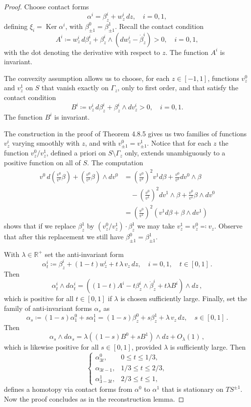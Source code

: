 \documentclass[a4paper, 11pt]{amsart}
\theoremstyle{plain}
\theoremstyle{definition}
\newcommand{\R}{\mathbb{R}}
\DeclareMathOperator{\Ker}{Ker}
\begin{document}
\begin{proof}
	Choose contact forms 
	\[
		\alpha^i = \beta^i_z + w^i_z\, dz, \quad i=0, 1,
	\]
	defining $\xi_i = \Ker \alpha^i$, with $\beta^0_{\pm 1} = \beta^1_{\pm 1}$. Recall the contact condition 
	\[
		A^i \coloneqq w^i_z\, d\beta^i_z + \beta^i_z \wedge (dw^i_z - \dot{\beta}^i_z) > 0, \quad i=0, 1,
	\]
	with the dot denoting the derivative with respect to $z$. The function $A^i$ is invariant.
	
	The convexity assumption allows us to choose, for each $z \in [-1, 1]$, functions $v^0_z$ and $v^1_z$ on $S$ that vanish exactly on $\Gamma_z$, only to first order, and that satisfy the contact condition
	\[
		B^i \coloneqq  v^i_z\, d\beta^i_z + \beta^i_z \wedge dv^i_z > 0, \quad i=0, 1.
	\]
	The function $B^i$ is invariant.
	
	The construction in the proof of Theorem 4.8.5 gives us two families of functions $v^i_z$ varying smoothly with $z$, and with $v^0_{\pm 1} = v^1_{\pm 1}$. Notice that for each $z$ the function $v^0_z/v^1_z$, defined a priori on $S \setminus \Gamma_z$ only, extends unambiguously to a positive function on all of $S$. The computation
	\[
	\begin{split} 
		v^0\, d\left(\frac{v^0}{v^1}\beta\right) + \left(\frac{v^0}{v^1}\beta\right) \wedge dv^0 &= \left(\frac{v^0}{v^1}\right)^2 v^1d\beta + \frac{v^0}{v^1} dv^0 \wedge \beta \\ 
		& \quad - \left(\frac{v^0}{v^1}\right)^2 dv^1 \wedge \beta + \frac{v^0}{v^1}\beta \wedge dv^0 \\ 
		&= \left(\frac{v^0}{v^1}\right)^2 (v^1 d\beta + \beta \wedge dv^1) 
	\end{split}
	\]
	shows that if we replace $\beta^1_z$ by $(v^0_z/v^1_z)\cdot \beta^1_z$ we may take $v^1_z= v^0_z \eqqcolon v_z$. Observe that after this replacement we still have $\beta^0_{\pm1} = \beta^1_{\pm1}$.
	
	With $\lambda \in \R^+$ set the anti-invariant form
	\[
		\alpha^i_t \coloneqq \beta^i_z + (1-t)w^i_z + t\,\lambda\, v_z\, dz, \quad i =0,1, \quad t\in [0,1]\,.
	\]
	Then
	\[
		\alpha^i_t \wedge d\alpha^i_t = ((1-t)A^i  - t\beta^i_z \wedge \dot{\beta}^i_z +t\lambda B^i) \wedge dz\,,
	\]
	which is positive for all $t \in [0,1]$ if $\lambda$ is chosen sufficiently large. Finally, set the family of anti-invariant forms $\alpha_s$ as
	\[
		\alpha_s \coloneqq (1-s)\alpha^0_1 +s \alpha^1_1 =(1-s)\beta^0_z +s\beta^1_z +\lambda\, v_z\, dz,\quad s \in  [0,1]\,.
	\]
	Then
	\[
		\alpha_s \wedge d\alpha_s = \lambda((1-s)B^0 +sB^1) \wedge dz+O_\lambda(1)\,,
	\]
	which is likewise positive for all $s \in [0,1]$, provided $\lambda$ is sufficiently large.
	Then
	\[
	\begin{cases}
	\alpha^0_{3t}, & 0 \le t \le 1/3, \\
	\alpha_{3t-1}, & 1/3 \le t \le 2/3,\\
	\alpha^1_{3-3t}, & 2/3 \le t \le 1,
	\end{cases}
	\]
	defines a homotopy via contact forms from $\alpha^0$ to $\alpha^1$ that is stationary on $TS^{\pm1}$. Now the proof concludes as in the reconstruction lemma.
\end{proof}
\end{document}
